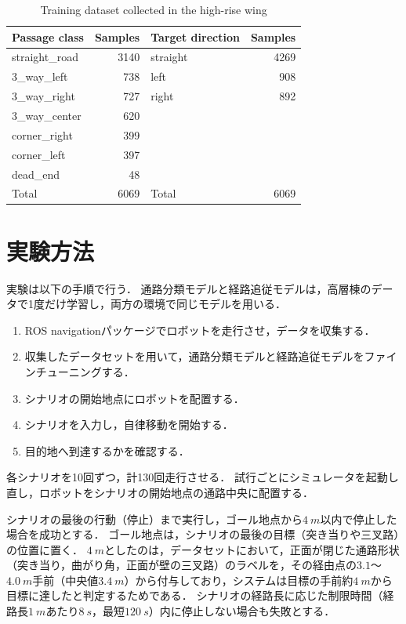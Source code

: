 \begin{table}[tb]
  \centering
  \caption{Training dataset collected in the high-rise wing}
  \label{tab:dataset}
  \begin{tabular}{lr@{\qquad}lr}
    \toprule
    Passage class & Samples & Target direction & Samples \\
    \midrule
    straight\_road & 3140 & straight & 4269 \\
    3\_way\_left   &  738 & left     &  908 \\
    3\_way\_right  &  727 & right    &  892 \\
    3\_way\_center &  620 &          &      \\
    corner\_right  &  399 &          &      \\
    corner\_left   &  397 &          &      \\
    dead\_end      &   48 &          &      \\
    \midrule
    Total & 6069 & Total & 6069 \\
    \bottomrule
  \end{tabular}
\end{table}

\section{実験方法}
\label{sec:experiment_method}

実験は以下の手順で行う．
通路分類モデルと経路追従モデルは，高層棟のデータで1度だけ学習し，両方の環境で同じモデルを用いる．
\begin{enumerate}[label=\arabic*)]
  \item ROS navigationパッケージでロボットを走行させ，データを収集する．
  \item 収集したデータセットを用いて，通路分類モデルと経路追従モデルをファインチューニングする．
  \item シナリオの開始地点にロボットを配置する．
  \item シナリオを入力し，自律移動を開始する．
  \item 目的地へ到達するかを確認する．
\end{enumerate}

各シナリオを10回ずつ，計130回走行させる．
試行ごとにシミュレータを起動し直し，ロボットをシナリオの開始地点の通路中央に配置する．

シナリオの最後の行動（停止）まで実行し，ゴール地点から$\SI{4}{m}$以内で停止した場合を成功とする．
ゴール地点は，シナリオの最後の目標（突き当りや三叉路）の位置に置く．
$\SI{4}{m}$としたのは，データセットにおいて，正面が閉じた通路形状（突き当り，曲がり角，正面が壁の三叉路）のラベルを，その経由点の$3.1$〜$\SI{4.0}{m}$手前（中央値$\SI{3.4}{m}$）から付与しており，システムは目標の手前約$\SI{4}{m}$から目標に達したと判定するためである．
シナリオの経路長に応じた制限時間（経路長$\SI{1}{m}$あたり$\SI{8}{s}$，最短$\SI{120}{s}$）内に停止しない場合も失敗とする．

